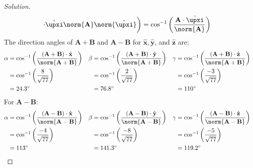 \documentclass[crop=false,class=article,oneside]{standalone}
\begin{document}
\begin{proof}[Solution]
\begin{equation*}
{                    \cdot\hat{\boldsymbol{\upxi}}}
                    {\norm{\mathbf{A}}
                    \norm{\hat{\boldsymbol{\upxi}}}}
                \bigg)
                =\cos^{-1}\bigg(
                    \frac{\mathbf{A}
                    \cdot\hat{\boldsymbol{\upxi}}}
                    {\norm{\mathbf{A}}}
                \bigg)
            \end{equation*}
            The direction angles of $\mathbf{A}+\mathbf{B}$
            and $\mathbf{A}-\mathbf{B}$ for
            $\hat{\mathbf{x}},\hat{\mathbf{y}}$,
            and $\hat{\mathbf{z}}$ are:
            \begin{align*}
                \alpha
                &=
                \cos^{-1}\bigg(
                    \frac{(\mathbf{A}+\mathbf{B})\cdot\hat{\mathbf{x}}}
                    {\norm{\mathbf{A+B}}}
                \bigg)
                &
                \beta
                &=\cos^{-1}\bigg(
                    \frac{(\mathbf{A}+\mathbf{B})\cdot \hat{\mathbf{y}}}
                    {\norm{\mathbf{A}+\mathbf{B}}}
                \bigg)
                &
                \gamma
                &=\cos^{-1}\bigg(
                    \frac{(\mathbf{A}+\mathbf{B})\cdot \hat{\mathbf{z}}}
                    {\norm{\mathbf{A}+\mathbf{B}}}
                \bigg)\\
                &=\cos^{-1}\bigg(\frac{8}{\sqrt{77}}\bigg)
                &
                &=\cos^{-1}\bigg(\frac{2}{\sqrt{77}}\bigg)&
                &=\cos^{-1}\bigg(\frac{-3}{\sqrt{77}}\bigg)\\
                &=24.3^{\circ}
                &
                &=76.8^{\circ}
                &
                &=110^{\circ}
            \end{align*}
            For $\mathbf{A}-\mathbf{B}$:
            \begin{align*}
                \alpha
                &=\cos^{-1}\bigg(
                    \frac{(\mathbf{A}-\mathbf{B})
                    \cdot\hat{\mathbf{x}}}
                    {\norm{\mathbf{A-B}}}
                \bigg)
                &
                \beta
                &=\cos^{-1}\bigg(
                \frac{(\mathbf{A}-\mathbf{B})
                \cdot\hat{\mathbf{y}}}
                    {\norm{\mathbf{A}-\mathbf{B}}}
                \bigg)
                &
                \gamma
                &=\cos^{-1}\bigg(
                    \frac{(\mathbf{A}-\mathbf{B})
                    \cdot\hat{\mathbf{z}}}
                    {\norm{\mathbf{A}-\mathbf{B}}}
                \bigg)\\
                &=
                \cos^{-1}\bigg(\frac{-4}{\sqrt{77}}\bigg)
                &
                &=\cos^{-1}\bigg(\frac{-8}{\sqrt{77}}\bigg)
                &
                &=\cos^{-1}\bigg(\frac{-5}{\sqrt{77}}\bigg)\\
                &=113^{\circ}
                &
                &=141.3^{\circ}
                &
                &=119.2^{\circ}
            \end{align*}
        \end{proof}
\end{document}
